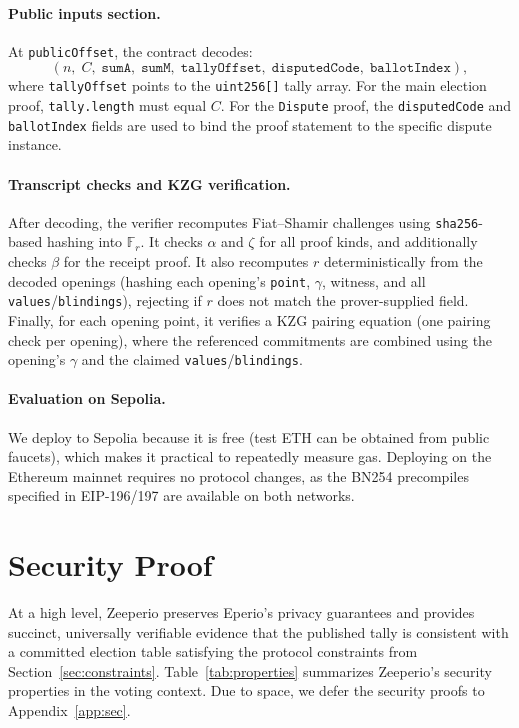 \paragraph{Public inputs section.}
	At \texttt{publicOffset}, the contract decodes:
	\[
	(n,\; C,\; \texttt{sumA},\; \texttt{sumM},\; \texttt{tallyOffset},\; \texttt{disputedCode},\; \texttt{ballotIndex}),
	\]
	where \texttt{tallyOffset} points to the \texttt{uint256[]} tally array. 
	For the main election proof, \texttt{tally.length} must equal $C$.
	For the \texttt{Dispute} proof, the \texttt{disputedCode} and \texttt{ballotIndex} fields are used to bind the proof statement to the specific dispute instance.

\paragraph{Transcript checks and KZG verification.}
After decoding, the verifier recomputes Fiat--Shamir challenges using \texttt{sha256}-based hashing into $\mathbb{F}_r$.
It checks $\alpha$ and $\zeta$ for all proof kinds, and additionally checks $\beta$ for the receipt proof.
It also recomputes $r$ deterministically from the decoded openings (hashing each opening's \texttt{point}, $\gamma$, witness,
and all \texttt{values}/\texttt{blindings}), rejecting if $r$ does not match the prover-supplied field.
Finally, for each opening point, it verifies a KZG pairing equation (one pairing check per opening), where the referenced commitments
are combined using the opening's $\gamma$ and the claimed \texttt{values}/\texttt{blindings}.

\paragraph{Evaluation on Sepolia.}
We deploy to Sepolia because it is free (test ETH can be obtained from public faucets), which makes it practical to repeatedly measure gas.
Deploying on the Ethereum mainnet requires no protocol changes, as the BN254 precompiles specified in EIP-196/197 are available on both networks.


\section{Security Proof}
\label{sec:security}

 

At a high level, Zeeperio preserves Eperio's privacy guarantees and provides succinct,
universally verifiable evidence that the published tally is consistent with a committed election
table satisfying the protocol constraints from Section~\ref{sec:constraints}.
Table~\ref{tab:properties} summarizes Zeeperio's security properties in the voting context. Due to space, we defer the security proofs to Appendix~\ref{app:sec}. 

